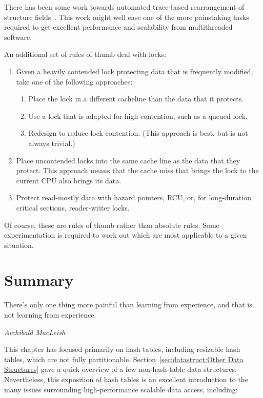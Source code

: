 There has been some work towards automated trace-based rearrangement
of structure
fields~\cite{Golovanevsky:2010:TDL:2174824.2174835}.
This work might well ease one of the more painstaking tasks
required to get excellent performance and scalability from
multithreaded software.

An additional set of rules of thumb deal with locks:

\begin{enumerate}
\item	Given a heavily contended lock protecting data that is
	frequently modified, take one of the following approaches:
	\begin{enumerate}
	\item	Place the lock in a different cacheline than the data
		that it protects.
	\item	Use a lock that is adapted for high contention, such
		as a queued lock.
	\item	Redesign to reduce lock contention.
		(This approach is best, but is not always trivial.)
	\end{enumerate}
\item	Place uncontended locks into the same cache line as the data
	that they protect.
	This approach means that the cache miss that brings the
	lock to the current CPU also brings its data.
\item	Protect read-mostly data with hazard pointers, RCU, or, for
	long-duration critical sections, reader-writer locks.
\end{enumerate}

Of course, these are rules of thumb rather than absolute rules.
Some experimentation is required to work out which are most applicable
to a given situation.

\section{Summary}
\label{sec:datastruct:Summary}
%
\epigraph{There's only one thing more painful than learning from
	  experience, and that is not learning from experience.}
	 {\emph{Archibald MacLeish}}

This chapter has focused primarily on hash tables, including resizable
hash tables, which are not fully partitionable.
Section~\ref{sec:datastruct:Other Data Structures} gave a quick
overview of a few non-hash-table data structures.
Nevertheless, this exposition of hash tables is an excellent introduction
to the many issues surrounding high-performance scalable data access,
including:

